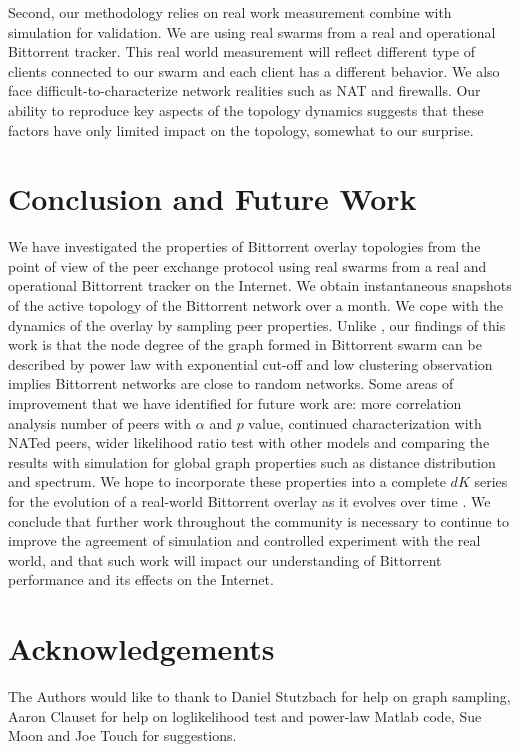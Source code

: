 \documentclass[10pt,conference,letterpaper]{IEEEtran}
\begin{document}
Second, our methodology relies on real work measurement combine with simulation for validation. 
We are using real swarms from a real and operational Bittorrent tracker. 
This real world measurement will reflect different type of clients connected to our swarm and each client has a different behavior. 
We also face difficult-to-characterize network realities such as NAT and firewalls. 
Our ability to reproduce key aspects of the topology dynamics suggests that these factors have only limited impact on the topology, somewhat to our surprise. 

\section{Conclusion and Future Work}\label{conclude}
We have investigated the properties of Bittorrent overlay topologies from the point of view of the peer exchange protocol using real swarms from a real and operational Bittorrent tracker on the Internet. 
We obtain instantaneous snapshots of the active topology of the Bittorrent network over a month.
We cope with the dynamics of the overlay by sampling peer properties. 
Unlike \cite{dale2008evolution}, our findings of this work is that the node degree of the graph formed in Bittorrent swarm can be described by power law with exponential cut-off and low clustering observation implies Bittorrent networks are close to random networks.
Some areas of improvement that we have identified for future work are: more correlation analysis number of peers with $\alpha$ and $p$ value, continued characterization with NATed peers, wider likelihood ratio test with other models and comparing the results with simulation for global graph properties such as distance distribution and spectrum.
We hope to incorporate these properties into a complete $dK$ series for the evolution of a real-world Bittorrent overlay as it evolves over time \cite{mahadevan2006systematic}. 
We conclude that further work throughout the community is necessary to continue to improve the agreement of simulation and controlled experiment with the real world, and that such work will impact our understanding of Bittorrent performance and its effects on the Internet.


\section*{Acknowledgements}
The Authors would like to thank to Daniel Stutzbach for help on graph sampling, Aaron Clauset for help on loglikelihood test and power-law Matlab code, Sue Moon and Joe Touch for suggestions.



\end{document}
